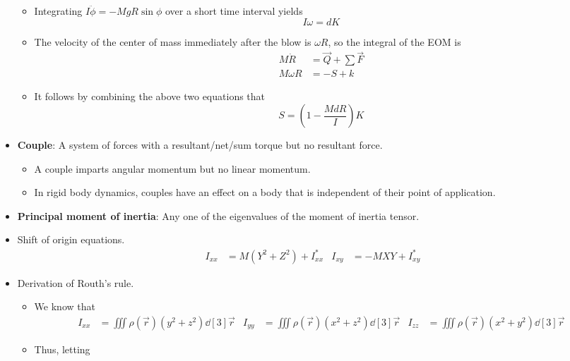 \documentclass[../notes.tex]{subfiles}
\begin{document}
\begin{itemize}
\begin{itemize}
        \item Integrating $I\ddot{\phi}=-MgR\sin\phi$ over a short time interval yields
        \begin{equation*}
            I\omega = dK
        \end{equation*}
        \item The velocity of the center of mass immediately after the blow is $\omega R$, so the integral of the EOM is
        \begin{align*}
            M\dot{R} &= \vec{Q}+\sum\vec{F}\\
            M\omega R &= -S+k
        \end{align*}
        \item It follows by combining the above two equations that
        \begin{equation*}
            S = \left(1-\frac{MdR}{I} \right)K
        \end{equation*}
    \end{itemize}
    \item \textbf{Couple}: A system of forces with a resultant/net/sum torque but no resultant force.
    \begin{itemize}
        \item A couple imparts angular momentum but no linear momentum.
        \item In rigid body dynamics, couples have an effect on a body that is independent of their point of application.
    \end{itemize}
    \item \textbf{Principal moment of inertia}: Any one of the eigenvalues of the moment of inertia tensor.
    \item Shift of origin equations.
    \begin{align*}
        I_{xx} &= M(Y^2+Z^2)+I_{xx}^*&
        I_{xy} &= -MXY+I_{xy}^*
    \end{align*}
    \item Derivation of Routh's rule.
    \begin{itemize}
        \item We know that
        \begin{align*}
            I_{xx} &= \iiint\rho(\vec{r})(y^2+z^2)\dd[3]{\vec{r}}&
            I_{yy} &= \iiint\rho(\vec{r})(x^2+z^2)\dd[3]{\vec{r}}&
            I_{zz} &= \iiint\rho(\vec{r})(x^2+y^2)\dd[3]{\vec{r}}
        \end{align*}
        \item Thus, letting
        \begin{equation*}

\end{equation*}
\end{itemize}
\end{itemize}
\end{document}
